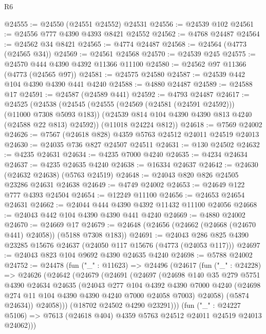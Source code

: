 \begin{lexlean}{R6}
\begin{coremodule}
@24555 := @24550 (@24551 @24552) @24531
@24556 := @24539 @102
@24561 := @24556 @777 @4390 @4393 @8421 @24552
@24562 := @4768 @24487
@24564 := @24562 @34 @8421
@24565 := @4774 @24487
@24568 := @24564 (@4773 (@24565 @34))
@24569 := @24561 @24568
@24570 := @24539 @245
@24575 := @24570 @444 @4390 @4392 @11366 @11100
@24580 := @24562 @97 @11366 (@4773 (@24565 @97))
@24581 := @24575 @24580
@24587 := @24539 @442 @104 @4390 @4390 @441 @4240
@24588 := @4880 @24487
@24589 := @24588 @17
@24591 := @24587 (@24589 @441)
@24592 := @4793 @24487
@24617 := @24525
    (@24538
      (@24545
        (@24555 (@24569 (@24581 (@24591 @24592))) (@11000 @7308 @5093 @183))
        (@24539 @814 @104 @4390 @4390 @813 @4240 (@24588 @22 @813) @24592))
      (@11018 @24224 @812))
@24618 := @7569 @24002
@24626 := @7567 (@24618 @828) @4359 @5763 @24512 @24011 @24519 @24013
@24630 := @24035 @736 @827 @24507 @24511
@24631 := @130 @24502
@24632 := @4235 @24631
@24634 := @4235 @7000 @4240
@24635 := @4234 @24634
@24637 := @4235 @24635 @4240
@24638 := @16334 @24637
@24642 := @24630 (@24632 @24638) (@5763 @24519)
@24648 := @24043 @820 @826 @24505 @23286 @24631 @24638
@24649 := @4749 @24002
@24653 := @24649 @122 @777 @4393 @24504
@24654 := @12249 @11100
@24656 := @24653 @24654 @24631
@24662 := @24044 @444 @4390 @4392 @11432 @11100 @24056
@24668 := @24043 @442 @104 @4390 @4390 @441 @4240
@24669 := @4880 @24002
@24670 := @24669 @17
@24679 := @24648 (@24656 (@24662 (@24668 (@24670 @441) @24058)) (@5188 @7308 @183))
@24691 := @24043 @286 @825 @4390 @23285 @15676 @24637 (@24050 @117 @15676 (@4773 (@24053 @117)))
@24697 := @24043 @823 @104 @9692 @4390 @24635 @4240
@24698 := @5788 @24002
@24752 := @24478
    (fun ("_" : @11623) =>
    @24496
      (@24617
        (fun ("_" : @24228) =>
        @24626
          (@24642
            (@24679
              (@24691
                (@24697
                  (@24698
                    @140
                    @35
                    @279
                    @5751
                    @4390
                    @24634
                    @24635
                    (@24043
                      @277
                      @104
                      @4392
                      @4390
                      @7000
                      @4240
                      (@24698 @274 @11 @104 @4390 @4390 @4240 @7000 @24058 @7003)
                      @24058)
                    (@5874 @24634))
                  @24058)))
            (@18702 @24502 @4290 @23291)))
        (fun ("_" : @24227 @5106) =>
        @7613 (@24618 @404) @4359 @5763 @24512 @24011 @24519 @24013 @24062)))

\end{coremodule}
\end{lexlean}
